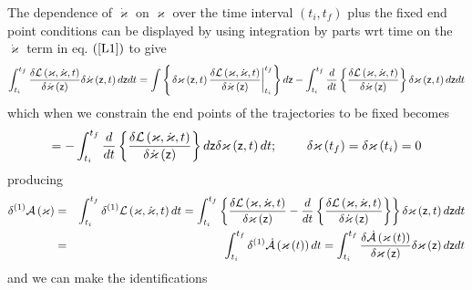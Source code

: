 The dependence of $\dot{\varkappa}$ on $\varkappa $ over the time interval $%
\left( t_{i},t_{f}\right) $ plus the fixed end point conditions can be
displayed by using integration by parts wrt time on the $\dot{\varkappa}$
term in eq. $\left( \ref{L1}\right) $ to give 
\begin{equation}
\int_{t_{i}}^{t_{f}}\frac{\delta {\cal L}\left( \varkappa ,\dot{\varkappa}%
,t\right) }{\delta \dot{\varkappa}\left( {\sf z}\right) }\delta \dot{%
\varkappa}\left( {\sf z},t\right) d{\sf z}dt=\int \left\{ \left. \delta
\varkappa \left( {\sf z},t\right) \frac{\delta {\cal L}\left( \varkappa ,%
\dot{\varkappa},t\right) }{\delta \dot{\varkappa}\left( {\sf z}\right) }%
\right| _{t_{i}}^{t_{f}}\right\} d{\sf z}-\int_{t_{i}}^{t_{f}}\frac{d}{dt}%
\left\{ \frac{\delta {\cal L}\left( {\cal \varkappa },{\cal \dot{\varkappa}}%
,t\right) }{\delta {\cal \dot{\varkappa}}\left( {\sf z}\right) }\right\}
\delta \varkappa \left( {\sf z},t\right) d{\sf z}dt
\end{equation}%
which when we constrain the end points of the trajectories to be fixed
becomes 
\begin{equation}
=-\int_{t_{i}}^{t_{f}}\frac{d}{dt}\left\{ \frac{\delta {\cal L}\left( {\cal %
\varkappa },{\cal \dot{\varkappa}},t\right) }{\delta {\cal \dot{\varkappa}}%
\left( {\sf z}\right) }\right\} d{\sf z}\delta \varkappa \left( {\sf z}%
,t\right) dt;\qquad \text{ }\delta \varkappa \left( t_{f}\right) =\delta
\varkappa \left( t_{i}\right) =0
\end{equation}%
producing 
\begin{eqnarray}
\delta ^{\left( 1\right) }{\cal A}\left( \varkappa \right)
&=&\int_{t_{i}}^{t_{f}}\delta ^{\left( 1\right) }{\cal L}\left( \varkappa ,%
\dot{\varkappa},t\right) dt=\int_{t_{i}}^{t_{f}}\left\{ \frac{\delta {\cal L}%
\left( {\cal \varkappa },{\cal \dot{\varkappa}},t\right) }{\delta {\cal %
\varkappa }\left( {\sf z}\right) }-\frac{d}{dt}\left\{ \frac{\delta {\cal L}%
\left( {\cal \varkappa },{\cal \dot{\varkappa}},t\right) }{\delta {\cal \dot{%
\varkappa}}\left( {\sf z}\right) }\right\} \right\} \delta \varkappa \left( 
{\sf z},t\right) d{\sf z}dt  \nonumber \\
&=&\int_{t_{i}}^{t_{f}}\delta ^{\left( 1\right) }{\cal \dot{A}}\left(
\varkappa \left( t\right) \right) dt=\int_{t_{i}}^{t_{f}}\frac{\delta {\cal 
\dot{A}}\left( \varkappa \left( t\right) \right) }{\delta \varkappa \left( 
{\sf z}\right) }\delta \varkappa \left( {\sf z}\right) d{\sf z}dt
\end{eqnarray}%
and we can make the identifications 
